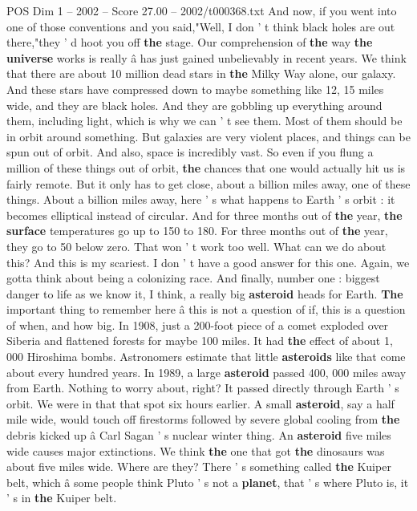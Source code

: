 \begin{textsample}{POS Dim 1 – 2002 – Score 27.00 – 2002/t000368.txt}
And now, if you went into one of those conventions and you said,"Well, I don ' t think black holes are out there,"they ' d hoot you off \textbf{the} stage.
Our comprehension of \textbf{the} way \textbf{the} \textbf{universe} works is really â has just gained unbelievably in recent years.
We think that there are about 10 million dead stars in \textbf{the} Milky Way alone, our galaxy.
And these stars have compressed down to maybe something like 12, 15 miles wide, and they are black holes.
And they are gobbling up everything around them, including light, which is why we can ' t see them.
Most of them should be in orbit around something.
But galaxies are very violent places, and things can be spun out of orbit.
And also, space is incredibly vast.
So even if you flung a million of these things out of orbit, \textbf{the} chances that one would actually hit us is fairly remote.
But it only has to get close, about a billion miles away, one of these things.
About a billion miles away, here ' s what happens to Earth ' s orbit : it becomes elliptical instead of circular.
And for three months out of \textbf{the} year, \textbf{the} \textbf{surface} temperatures go up to 150 to 180.
For three months out of \textbf{the} year, they go to 50 below zero.
That won ' t work too well.
What can we do about this?
And this is my scariest.
I don ' t have a good answer for this one.
Again, we gotta think about being a colonizing race.
And finally, number one : biggest danger to life as we know it, I think, a really big \textbf{asteroid} heads for Earth. \textbf{The} important thing to remember here â this is not a question of if, this is a question of when, and how big.
In 1908, just a 200-foot piece of a comet exploded over Siberia and flattened forests for maybe 100 miles.
It had \textbf{the} effect of about 1, 000 Hiroshima bombs.
Astronomers estimate that little \textbf{asteroids} like that come about every hundred years.
In 1989, a large \textbf{asteroid} passed 400, 000 miles away from Earth.
Nothing to worry about, right?
It passed directly through Earth ' s orbit.
We were in that that spot six hours earlier.
A small \textbf{asteroid}, say a half mile wide, would touch off firestorms followed by severe global cooling from \textbf{the} debris kicked up â Carl Sagan ' s nuclear winter thing.
An \textbf{asteroid} five miles wide causes major extinctions.
We think \textbf{the} one that got \textbf{the} dinosaurs was about five miles wide.
Where are they?
There ' s something called \textbf{the} Kuiper belt, which â some people think Pluto ' s not a \textbf{planet}, that ' s where Pluto is, it ' s in \textbf{the} Kuiper belt.

\end{textsample}

